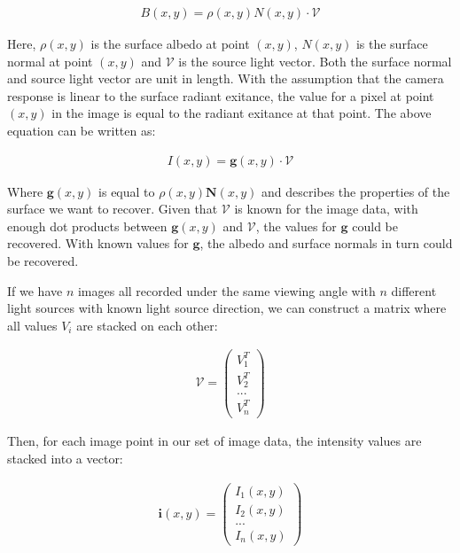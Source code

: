 	\begin{eqnarray*}
		B(x,y) = \rho(x,y)N(x,y) \cdot \mathcal{V}
	\end{eqnarray*}

\noindent Here, $\rho(x,y)$ is the surface albedo at point $(x,y)$, $N(x,y)$ is the surface normal at point $(x,y)$ and $\mathcal{V}$ is the source light vector. Both the surface normal and source light vector are unit in length. With the assumption that the camera response is linear to the surface radiant exitance, the value for a pixel at point $(x,y)$ in the image is equal to the radiant exitance at that point. The above equation can be written as:

	\begin{eqnarray*}
		I(x,y) =  \textbf{g}(x,y) \cdot \mathcal{V}
	\end{eqnarray*}

\noindent Where $\textbf{g}(x,y)$ is equal to $\rho(x,y)\textbf{N}(x,y)$ and describes the properties of the surface we want to recover. Given that $\mathcal{V}$ is known for the image data, with enough dot products between $\textbf{g}(x,y)$ and $\mathcal{V}$, the values for $\textbf{g}$ could be recovered. With known values for $\textbf{g}$, the albedo and surface normals in turn could be recovered.

If we have $n$ images all recorded under the same viewing angle with $n$ different light sources with known light source direction, we can construct a matrix where all values $V_i$ are stacked on each other:

	\begin{eqnarray*}
		\mathcal{V} = \begin{pmatrix} V_1^T \\ V_2^T \\ ... \\ V_n^T \end{pmatrix}
	\end{eqnarray*}

\noindent Then, for each image point in our set of image data, the intensity values are stacked into a vector:

	\begin{eqnarray*}
		\textbf{i}(x,y) = \begin{pmatrix} I_1(x,y) \\ I_2(x,y) \\ ... \\ I_n(x,y) \end{pmatrix}
	\end{eqnarray*}


